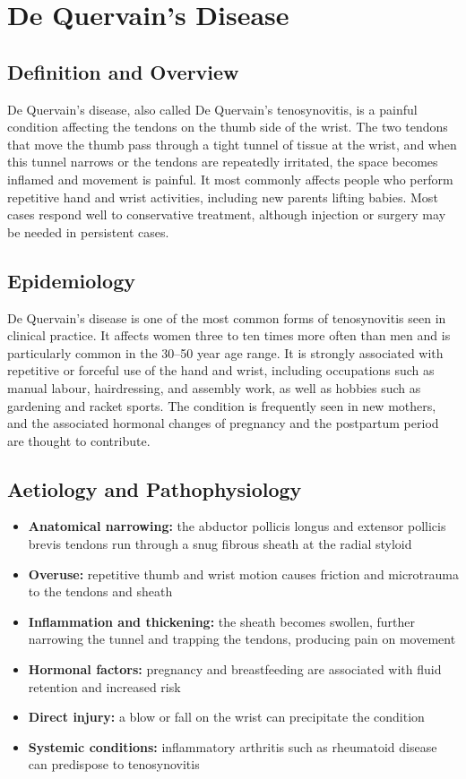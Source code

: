 \chapter{De Quervain's Disease}

\section*{Definition and Overview}
De Quervain's disease, also called De Quervain's tenosynovitis, is a painful condition affecting the tendons on the thumb side of the wrist. The two tendons that move the thumb pass through a tight tunnel of tissue at the wrist, and when this tunnel narrows or the tendons are repeatedly irritated, the space becomes inflamed and movement is painful. It most commonly affects people who perform repetitive hand and wrist activities, including new parents lifting babies. Most cases respond well to conservative treatment, although injection or surgery may be needed in persistent cases.

\section*{Epidemiology}
De Quervain's disease is one of the most common forms of tenosynovitis seen in clinical practice. It affects women three to ten times more often than men and is particularly common in the 30--50 year age range. It is strongly associated with repetitive or forceful use of the hand and wrist, including occupations such as manual labour, hairdressing, and assembly work, as well as hobbies such as gardening and racket sports. The condition is frequently seen in new mothers, and the associated hormonal changes of pregnancy and the postpartum period are thought to contribute.

\section*{Aetiology and Pathophysiology}
\begin{itemize}
    \item \textbf{Anatomical narrowing:} the abductor pollicis longus and extensor pollicis brevis tendons run through a snug fibrous sheath at the radial styloid
    \item \textbf{Overuse:} repetitive thumb and wrist motion causes friction and microtrauma to the tendons and sheath
    \item \textbf{Inflammation and thickening:} the sheath becomes swollen, further narrowing the tunnel and trapping the tendons, producing pain on movement
    \item \textbf{Hormonal factors:} pregnancy and breastfeeding are associated with fluid retention and increased risk
    \item \textbf{Direct injury:} a blow or fall on the wrist can precipitate the condition
    \item \textbf{Systemic conditions:} inflammatory arthritis such as rheumatoid disease can predispose to tenosynovitis
\end{itemize}

